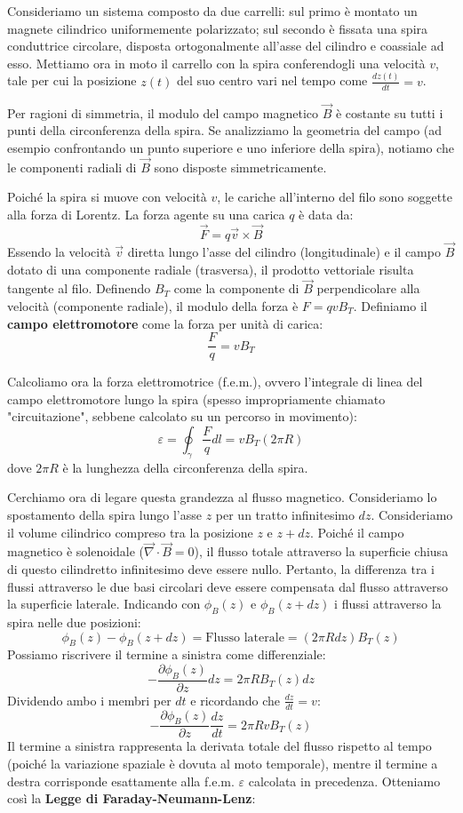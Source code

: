 \documentclass{book}
\begin{document}
Consideriamo un sistema composto da due carrelli: sul primo è montato un magnete cilindrico uniformemente polarizzato; sul secondo è fissata una spira conduttrice circolare, disposta ortogonalmente all'asse del cilindro e coassiale ad esso.
Mettiamo ora in moto il carrello con la spira conferendogli una velocità $v$, tale per cui la posizione $z(t)$ del suo centro vari nel tempo come $\frac{dz(t)}{dt}=v$.

Per ragioni di simmetria, il modulo del campo magnetico $\vec{B}$ è costante su tutti i punti della circonferenza della spira. Se analizziamo la geometria del campo (ad esempio confrontando un punto superiore e uno inferiore della spira), notiamo che le componenti radiali di $\vec{B}$ sono disposte simmetricamente.

Poiché la spira si muove con velocità $v$, le cariche all'interno del filo sono soggette alla forza di Lorentz. La forza agente su una carica $q$ è data da:
$$ \vec{F} = q\vec{v}\times\vec{B} $$
Essendo la velocità $\vec{v}$ diretta lungo l'asse del cilindro (longitudinale) e il campo $\vec{B}$ dotato di una componente radiale (trasversa), il prodotto vettoriale risulta tangente al filo.
Definendo $B_T$ come la componente di $\vec{B}$ perpendicolare alla velocità (componente radiale), il modulo della forza è $F=qvB_T$.
Definiamo il \textbf{campo elettromotore} come la forza per unità di carica:
$$\frac{F}{q}=vB_T$$

Calcoliamo ora la forza elettromotrice (f.e.m.), ovvero l'integrale di linea del campo elettromotore lungo la spira (spesso impropriamente chiamato "circuitazione", sebbene calcolato su un percorso in movimento):
$$\varepsilon = \oint_{\gamma}\frac{F}{q}dl = v B_T (2\pi R)$$
dove $2\pi R$ è la lunghezza della circonferenza della spira.

Cerchiamo ora di legare questa grandezza al flusso magnetico. Consideriamo lo spostamento della spira lungo l'asse $z$ per un tratto infinitesimo $dz$. Consideriamo il volume cilindrico compreso tra la posizione $z$ e $z+dz$. Poiché il campo magnetico è solenoidale ($\vec{\nabla}\cdot\vec{B}=0$), il flusso totale attraverso la superficie chiusa di questo cilindretto infinitesimo deve essere nullo. Pertanto, la differenza tra i flussi attraverso le due basi circolari deve essere compensata dal flusso attraverso la superficie laterale.
Indicando con $\phi_B(z)$ e $\phi_B(z+dz)$ i flussi attraverso la spira nelle due posizioni:
$$
\phi_B(z) - \phi_B(z+dz) = \text{Flusso laterale} = (2\pi R dz) B_T(z)
$$
Possiamo riscrivere il termine a sinistra come differenziale:
$$
-\frac{\partial\phi_B(z)}{\partial z} dz = 2\pi R B_T(z) dz
$$
Dividendo ambo i membri per $dt$ e ricordando che $\frac{dz}{dt}=v$:
$$
-\frac{\partial\phi_B(z)}{\partial z} \frac{dz}{dt} = 2\pi R v B_T(z)
$$
Il termine a sinistra rappresenta la derivata totale del flusso rispetto al tempo (poiché la variazione spaziale è dovuta al moto temporale), mentre il termine a destra corrisponde esattamente alla f.e.m. $\varepsilon$ calcolata in precedenza. Otteniamo così la \textbf{Legge di Faraday-Neumann-Lenz}:
\end{document}
